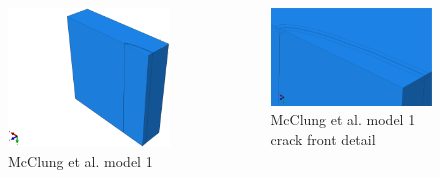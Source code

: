 \begin{frame}
\begin{columns}
\begin{column}{0.45\textwidth}
  \begin{figure}
    \centering
    \includegraphics[width=\columnwidth]{model1-assembly}
    \caption{McClung et al. model 1\label{fig:model1-assembly}}
  \end{figure}
\end{column}
\begin{column}{0.45\textwidth}
  \begin{figure}
    \centering
    \includegraphics[width=\columnwidth]{model1-assembly-zoomed}
    \caption{McClung et al. model 1 crack front detail\label{fig:model1-assembly-zoomed}}
  \end{figure}
\end{column}
\end{columns}

\end{frame}


